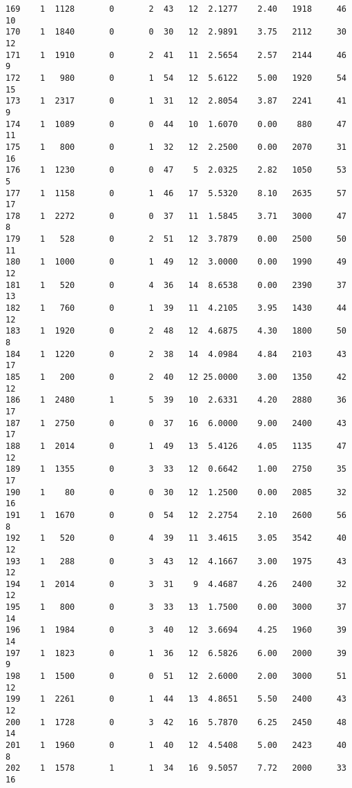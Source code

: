 \documentclass[
  letterpaper,
  DIV=11,
  numbers=noendperiod]{scrreprt}
\begin{document}
\begin{verbatim}
169    1  1128       0       2  43   12  2.1277    2.40   1918     46      10
170    1  1840       0       0  30   12  2.9891    3.75   2112     30      12
171    1  1910       0       2  41   11  2.5654    2.57   2144     46       9
172    1   980       0       1  54   12  5.6122    5.00   1920     54      15
173    1  2317       0       1  31   12  2.8054    3.87   2241     41       9
174    1  1089       0       0  44   10  1.6070    0.00    880     47      11
175    1   800       0       1  32   12  2.2500    0.00   2070     31      16
176    1  1230       0       0  47    5  2.0325    2.82   1050     53       5
177    1  1158       0       1  46   17  5.5320    8.10   2635     57      17
178    1  2272       0       0  37   11  1.5845    3.71   3000     47       8
179    1   528       0       2  51   12  3.7879    0.00   2500     50      11
180    1  1000       0       1  49   12  3.0000    0.00   1990     49      12
181    1   520       0       4  36   14  8.6538    0.00   2390     37      13
182    1   760       0       1  39   11  4.2105    3.95   1430     44      12
183    1  1920       0       2  48   12  4.6875    4.30   1800     50       8
184    1  1220       0       2  38   14  4.0984    4.84   2103     43      17
185    1   200       0       2  40   12 25.0000    3.00   1350     42      12
186    1  2480       1       5  39   10  2.6331    4.20   2880     36      17
187    1  2750       0       0  37   16  6.0000    9.00   2400     43      17
188    1  2014       0       1  49   13  5.4126    4.05   1135     47      12
189    1  1355       0       3  33   12  0.6642    1.00   2750     35      17
190    1    80       0       0  30   12  1.2500    0.00   2085     32      16
191    1  1670       0       0  54   12  2.2754    2.10   2600     56       8
192    1   520       0       4  39   11  3.4615    3.05   3542     40      12
193    1   288       0       3  43   12  4.1667    3.00   1975     43      12
194    1  2014       0       3  31    9  4.4687    4.26   2400     32      12
195    1   800       0       3  33   13  1.7500    0.00   3000     37      14
196    1  1984       0       3  40   12  3.6694    4.25   1960     39      14
197    1  1823       0       1  36   12  6.5826    6.00   2000     39       9
198    1  1500       0       0  51   12  2.6000    2.00   3000     51      12
199    1  2261       0       1  44   13  4.8651    5.50   2400     43      12
200    1  1728       0       3  42   16  5.7870    6.25   2450     48      14
201    1  1960       0       1  40   12  4.5408    5.00   2423     40       8
202    1  1578       1       1  34   16  9.5057    7.72   2000     33      16

\end{verbatim}
\end{document}
